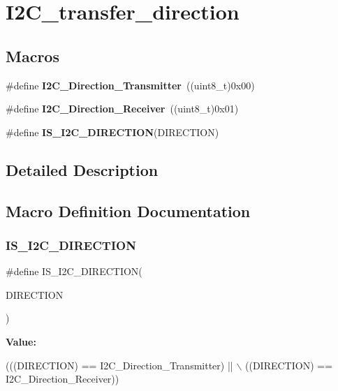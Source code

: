 \hypertarget{group___i2_c__transfer__direction}{}\section{I2\+C\+\_\+transfer\+\_\+direction}
\label{group___i2_c__transfer__direction}
\subsection*{Macros}
\begin{DoxyCompactItemize}
\item 
\mbox{\label{group___i2_c__transfer__direction_ga9895ee2d7d8cc8ba4daafafa1c3ce1ac}} 
\#define {\bfseries I2\+C\+\_\+\+Direction\+\_\+\+Transmitter}~((uint8\+\_\+t)0x00)
\item 
\mbox{\label{group___i2_c__transfer__direction_gafe3b9b98552980ca56c8e21a90040fa0}} 
\#define {\bfseries I2\+C\+\_\+\+Direction\+\_\+\+Receiver}~((uint8\+\_\+t)0x01)
\item 
\#define {\bfseries I\+S\+\_\+\+I2\+C\+\_\+\+D\+I\+R\+E\+C\+T\+I\+ON}(D\+I\+R\+E\+C\+T\+I\+ON)
\end{DoxyCompactItemize}


\subsection{Detailed Description}


\subsection{Macro Definition Documentation}
\mbox{\label{group___i2_c__transfer__direction_ga33368efe652bc25b4f4b74f02ce0657e}} 
\subsubsection{\texorpdfstring{I\+S\+\_\+\+I2\+C\+\_\+\+D\+I\+R\+E\+C\+T\+I\+ON}{IS\_I2C\_DIRECTION}}
{\footnotesize\ttfamily \#define I\+S\+\_\+\+I2\+C\+\_\+\+D\+I\+R\+E\+C\+T\+I\+ON(\begin{DoxyParamCaption}\item[{}]{D\+I\+R\+E\+C\+T\+I\+ON }\end{DoxyParamCaption})}

{\bfseries Value\+:}
\begin{DoxyCode}
(((DIRECTION) == I2C\_Direction\_Transmitter) || \(\backslash\)
                                     ((DIRECTION) == I2C\_Direction\_Receiver))
\end{DoxyCode}
